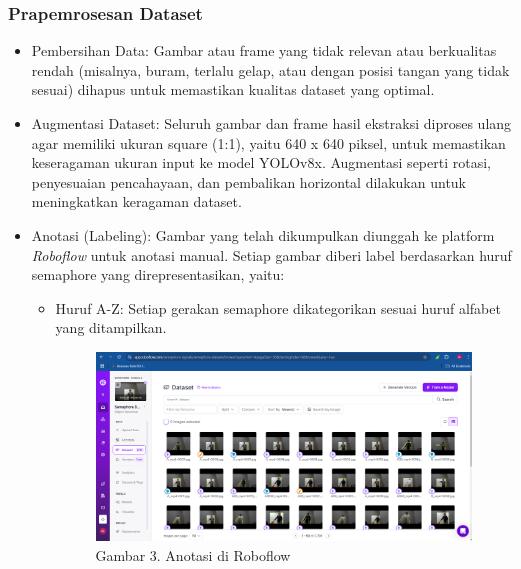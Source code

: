 \documentclass[12pt,a4paper]{article}
\begin{document}
\subsubsection{Prapemrosesan Dataset}
\begin{itemize}
    \item Pembersihan Data: Gambar atau frame yang tidak relevan atau berkualitas rendah (misalnya, buram, terlalu gelap, atau dengan posisi tangan yang tidak sesuai) dihapus untuk memastikan kualitas dataset yang optimal.
    \item Augmentasi Dataset: Seluruh gambar dan frame hasil ekstraksi diproses ulang agar memiliki ukuran square (1:1), yaitu 640 x 640 piksel, untuk memastikan keseragaman ukuran input ke model YOLOv8x. Augmentasi seperti rotasi, penyesuaian pencahayaan, dan pembalikan horizontal dilakukan untuk meningkatkan keragaman dataset.
    \item Anotasi (Labeling): Gambar yang telah dikumpulkan diunggah ke platform \textit{Roboflow} untuk anotasi manual. Setiap gambar diberi label berdasarkan huruf semaphore yang direpresentasikan, yaitu: 
    \begin{itemize}
        \item Huruf A-Z: Setiap gerakan semaphore dikategorikan sesuai huruf alfabet yang ditampilkan.
        \begin{figure}[h]
            \centering
            \includegraphics[width=0.8\linewidth]{Images/Gambar3.png}
            \caption*{Gambar 3. Anotasi di Roboflow}
            \label{fig:enter-label}
        \end{figure}
    \end{itemize}
\end{itemize}
\end{document}
